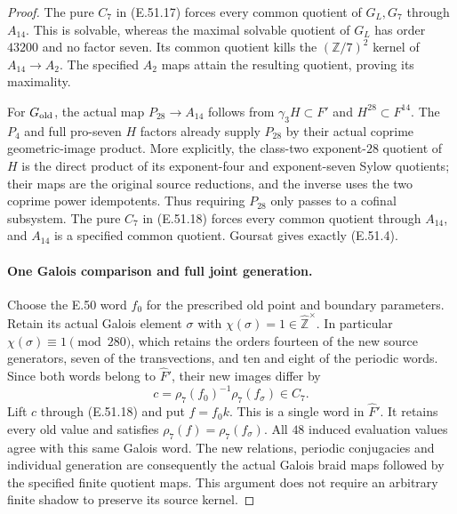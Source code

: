 \begin{proof}
The pure $C_7$ in \textup{(E.51.17)} forces every
common quotient of $G_L,G_7$ through $A_{14}$.
This is solvable, whereas the maximal solvable
quotient of $G_L$ has order $43200$ and no factor
seven.  Its common quotient kills the $(\mathbb Z/7)^2$
kernel of $A_{14}\to A_2$.  The specified $A_2$
maps attain the resulting quotient, proving its
maximality.

For $G_{\rm old}$, the actual map $P_{28}\to A_{14}$
follows from $\gamma_3H\subset F'$ and
$H^{28}\subset F^{14}$.  The $P_4$ and full pro-seven
$H$ factors already supply $P_{28}$ by their actual
coprime geometric-image product.  More explicitly,
the class-two exponent-$28$ quotient of $H$ is the
direct product of its exponent-four and exponent-seven
Sylow quotients; their maps are the original source
reductions, and the inverse uses the two coprime
power idempotents.  Thus requiring $P_{28}$
only passes to a cofinal subsystem.  The pure $C_7$
in \textup{(E.51.18)} forces every common quotient
through $A_{14}$, and $A_{14}$ is a specified common
quotient.  Goursat gives exactly
\textup{(E.51.4)}.

\paragraph{One Galois comparison and full joint generation.}
Choose the E.50 word $f_0$ for the prescribed old
point and boundary parameters.  Retain its actual
Galois element $\sigma$ with
$\chi(\sigma)=1\in\widehat{\mathbb Z}^{\times}$.
In particular $\chi(\sigma)\equiv1\pmod{280}$,
which retains the orders fourteen of the new
source generators, seven of the transvections,
and ten and eight of the periodic words.
Since both words belong to $\widehat F'$, their
new images differ by
\[
          c=\rho_7(f_0)^{-1}\rho_7(f_\sigma)\in C_7.
\tag{E.51.19}
\]
Lift $c$ through \textup{(E.51.18)} and put $f=f_0k$.
This is a single word in $\widehat F'$.  It retains
every old value and satisfies
$\rho_7(f)=\rho_7(f_\sigma)$.  All $48$ induced
evaluation values agree with this same Galois word.
The new relations, periodic conjugacies and
individual generation are consequently the actual
Galois braid maps followed by the specified finite
quotient maps.  This argument does not require
an arbitrary finite shadow to preserve its source
kernel.


\end{proof}
